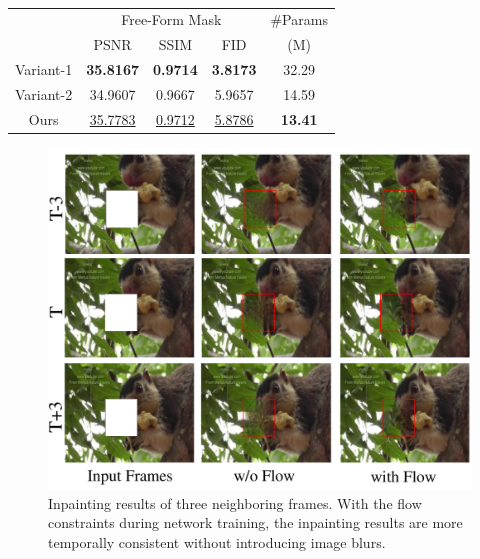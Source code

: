 \begin{table}[t]
	\caption{ }\smallskip
	\scriptsize
	\centering
	{
		\smallskip\begin{tabular}{c|c|c|c|c}
			\hline
			&\multicolumn{3}{c|}{Free-Form Mask}& \#Params \\
			\cline{2-4} 
			& PSNR & SSIM & FID  & (M) \\
			
			\hline
			Variant-1  &\textbf{35.8167} &\textbf{0.9714} & \textbf{3.8173}& 32.29 \\ \hline
			Variant-2 & 34.9607& 0.9667& 5.9657& 14.59
			\\ \hline
			Ours
			&\underline{35.7783}  &\underline{0.9712}  &   \underline{5.8786}  &\textbf{13.41} \\
			\hline
			
			
		\end{tabular}
	}
	\label{tab:com-enet-arch}
\end{table}

\begin{figure}[t]
	\centering
	\includegraphics[width=0.9\columnwidth]{flow_vis} %
	\caption{Inpainting results of three neighboring frames. With the flow constraints during network training, the inpainting results are more temporally consistent without introducing image blurs. }
	\label{flow_vis}
\end{figure}







